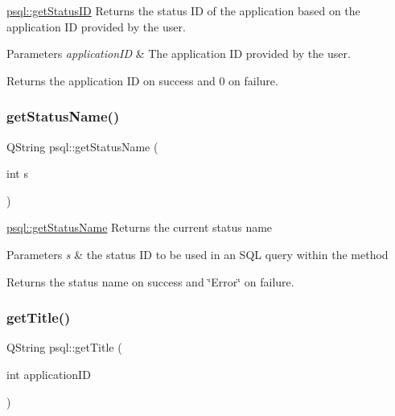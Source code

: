 \hyperlink{classpsql_a9c02c92c09cb60c35d24375673b7df06}{psql\+::get\+Status\+ID} Returns the status ID of the application based on the application ID provided by the user. 


\begin{DoxyParams}{Parameters}
{\em application\+ID} & The application ID provided by the user. \\
\hline
\end{DoxyParams}
\begin{DoxyReturn}{Returns}
the application ID on success and 0 on failure. 
\end{DoxyReturn}
\mbox{\label{classpsql_a5c2a64419a68a258071fd1f9a37c7c09}} 
\subsubsection{\texorpdfstring{get\+Status\+Name()}{getStatusName()}}
{\footnotesize\ttfamily Q\+String psql\+::get\+Status\+Name (\begin{DoxyParamCaption}\item[{int}]{s }\end{DoxyParamCaption})}



\hyperlink{classpsql_a5c2a64419a68a258071fd1f9a37c7c09}{psql\+::get\+Status\+Name} Returns the current status name 


\begin{DoxyParams}{Parameters}
{\em s} & the status ID to be used in an S\+QL query within the method \\
\hline
\end{DoxyParams}
\begin{DoxyReturn}{Returns}
the status name on success and \char`\"{}\+Error\char`\"{} on failure. 
\end{DoxyReturn}
\mbox{\label{classpsql_ada9e3be3e0866011edf53e30ec510afc}} 
\subsubsection{\texorpdfstring{get\+Title()}{getTitle()}}
{\footnotesize\ttfamily Q\+String psql\+::get\+Title (\begin{DoxyParamCaption}\item[{int}]{application\+ID }\end{DoxyParamCaption})}



